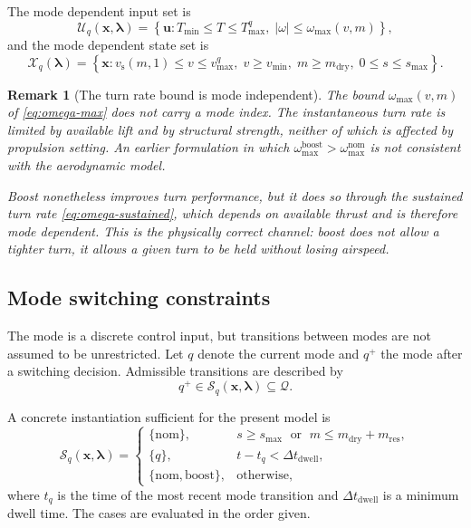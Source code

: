 \documentclass[11pt,a4paper]{article}
\newtheorem{remark}{Remark}
\newcommand{\Xset}{\mathcal{X}}
\newcommand{\Uset}{\mathcal{U}}
\newcommand{\Qset}{\mathcal{Q}}
\newcommand{\Sset}{\mathcal{S}}
\newcommand{\vecx}{\bm{x}}
\newcommand{\vecu}{\bm{u}}
\newcommand{\veclambda}{\bm{\lambda}}
\begin{document}
The mode dependent input set is
\begin{equation}
  \Uset_q(\vecx, \veclambda) = \left\{
    \vecu : T_{\min} \le T \le T^{q}_{\max},\;
    |\omega| \le \omega_{\max}(v, m)
  \right\},
\end{equation}
and the mode dependent state set is
\begin{equation}
  \Xset_q(\veclambda) = \left\{
    \vecx : v_{\mathrm{s}}(m,1) \le v \le v^{q}_{\max},\;
    v \ge v_{\min},\;
    m \ge m_{\mathrm{dry}},\;
    0 \le s \le s_{\max}
  \right\}.
\end{equation}

\begin{remark}[The turn rate bound is mode independent]
\label{rem:mode-independent-turn}
The bound $\omega_{\max}(v,m)$ of \cref{eq:omega-max} does not carry a mode
index. The instantaneous turn rate is limited by available lift and by structural
strength, neither of which is affected by propulsion setting. An earlier
formulation in which $\omega^{\mathrm{boost}}_{\max} > \omega^{\mathrm{nom}}_{\max}$
is not consistent with the aerodynamic model.

Boost nonetheless improves turn performance, but it does so through the
\emph{sustained} turn rate \cref{eq:omega-sustained}, which depends on available
thrust and is therefore mode dependent. This is the physically correct channel:
boost does not allow a tighter turn, it allows a given turn to be held without
losing airspeed.
\end{remark}

\subsection{Mode switching constraints}
\label{sec:mode-switching}

The mode is a discrete control input, but transitions between modes are not
assumed to be unrestricted. Let $q$ denote the current mode and $q^{+}$ the mode
after a switching decision. Admissible transitions are described by
\begin{equation}
  q^{+} \in \Sset_q(\vecx, \veclambda) \subseteq \Qset .
  \label{eq:switching-abstract}
\end{equation}

A concrete instantiation sufficient for the present model is
\begin{equation}
  \Sset_{q}(\vecx, \veclambda) =
  \begin{cases}
    \{\mathrm{nom}\},
      & s \ge s_{\max}
        \;\text{ or }\;
        m \le m_{\mathrm{dry}} + m_{\mathrm{res}}, \\[4pt]
    \{q\},
      & t - t_{q} < \Delta t_{\mathrm{dwell}}, \\[4pt]
    \{\mathrm{nom}, \mathrm{boost}\},
      & \text{otherwise,}
  \end{cases}
  \label{eq:switching-concrete}
\end{equation}
where $t_q$ is the time of the most recent mode transition and
$\Delta t_{\mathrm{dwell}}$ is a minimum dwell time. The cases are evaluated
in the order given.
\end{document}
